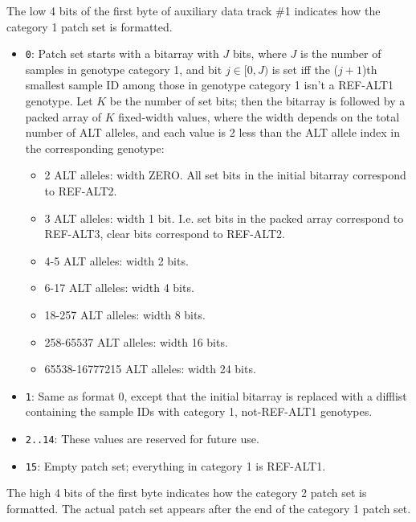 \documentclass[8pt]{article}
\begin{document}
The low 4 bits of the first byte of auxiliary data track \#1 indicates how the
category 1 patch set is formatted.

\begin{itemize}
\item \texttt{0}: Patch set starts with a bitarray with $J$ bits, where $J$ is
  the number of samples in genotype category 1, and bit $j\in [0, J)$ is set
  iff the ($j+1$)th smallest sample ID among those in genotype category 1 isn't
  a REF-ALT1 genotype.  Let $K$ be the number of set bits; then the bitarray is
  followed by a packed array of $K$ fixed-width values, where the width depends
  on the total number of ALT alleles, and each value is 2 less than the ALT
  allele index in the corresponding genotype:
  \begin{itemize}
  \item 2 ALT alleles: width ZERO.  All set bits in the initial bitarray
    correspond to REF-ALT2.
  \item 3 ALT alleles: width 1 bit.  I.e. set bits in the packed array
    correspond to REF-ALT3, clear bits correspond to REF-ALT2.
  \item 4-5 ALT alleles: width 2 bits.
  \item 6-17 ALT alleles: width 4 bits.
  \item 18-257 ALT alleles: width 8 bits.
  \item 258-65537 ALT alleles: width 16 bits.
  \item 65538-16777215 ALT alleles: width 24 bits.
  \end{itemize}
\item \texttt{1}: Same as format 0, except that the initial bitarray is
  replaced with a difflist containing the sample IDs with category 1,
  not-REF-ALT1 genotypes.
\item \texttt{2..14}: These values are reserved for future use.
\item \texttt{15}: Empty patch set; everything in category 1 is REF-ALT1.
\end{itemize}

The high 4 bits of the first byte indicates how the category 2 patch set is
formatted.  The actual patch set appears after the end of the category 1 patch
set.
\end{document}
